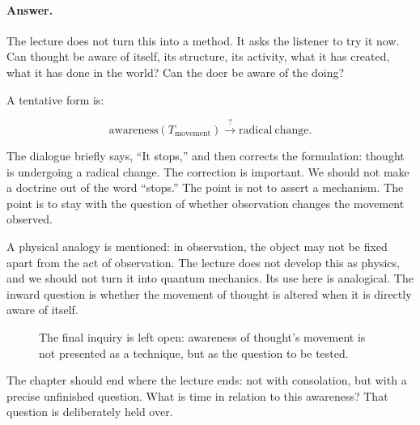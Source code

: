 \paragraph{Answer.}
The lecture does not turn this into a method. It asks the listener to try it now. Can thought be aware of itself, its structure, its activity, what it has created, what it has done in the world? Can the doer be aware of the doing?

A tentative form is:

\begin{equation}
\mathrm{awareness}(T_{\mathrm{movement}})
\overset{?}{\longrightarrow}
\mathrm{radical\ change}.
\end{equation}

The dialogue briefly says, ``It stops,'' and then corrects the formulation: thought is undergoing a radical change. The correction is important. We should not make a doctrine out of the word ``stops.'' The point is not to assert a mechanism. The point is to stay with the question of whether observation changes the movement observed.

A physical analogy is mentioned: in observation, the object may not be fixed apart from the act of observation. The lecture does not develop this as physics, and we should not turn it into quantum mechanics. Its use here is analogical. The inward question is whether the movement of thought is altered when it is directly aware of itself.

\begin{figure}
\centering
{}
\caption{The final inquiry is left open: awareness of thought's movement is not presented as a technique, but as the question to be tested.}
\end{figure}

The chapter should end where the lecture ends: not with consolation, but with a precise unfinished question. What is time in relation to this awareness? That question is deliberately held over.

